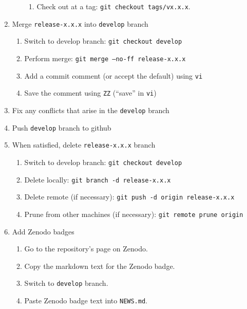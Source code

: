 \documentclass{article}
\begin{document}
\begin{enumerate}
\begin{enumerate}
\begin{enumerate}
	  \item Check out at a tag: \texttt{git checkout tags/vx.x.x}.

	\end{enumerate}
  \end{enumerate}
  \item Merge \texttt{release-x.x.x} into \texttt{develop} branch
  \begin{enumerate}

	\item Switch to develop branch: \texttt{git checkout develop}

    \item Perform merge: \texttt{git merge --no-ff release-x.x.x}
	
	\item Add a commit comment (or accept the default) using \texttt{vi} 
	
	\item Save the comment using \texttt{ZZ} (``save'' in \texttt{vi})

  \end{enumerate}
  \item Fix any conflicts that arise in the \texttt{develop} branch
  
  \item Push \texttt{develop} branch to github
  
  \item When satisfied, delete \texttt{release-x.x.x} branch
  \begin{enumerate}

    \item Switch to develop branch: \texttt{git checkout develop}

    \item Delete locally: \texttt{git branch -d release-x.x.x}

    \item Delete remote (if necessary): \texttt{git push -d origin release-x.x.x} 
	
	\item Prune from other machines (if necessary): \texttt{git remote prune origin} 

  \end{enumerate}
  
  \item Add Zenodo badges
  \begin{enumerate}
	  
    \item Go to the repository's page on Zenodo.

    \item Copy the markdown text for the Zenodo badge.
	
	\item Switch to \texttt{develop} branch.

	\item Paste Zenodo badge text into \texttt{NEWS.md}.

  \end{enumerate}
  
\end{enumerate}
\end{document}
